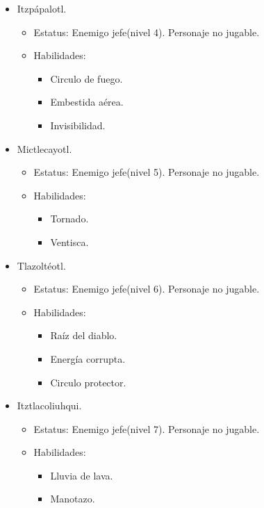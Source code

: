\begin{itemize}
\begin{itemize}
			\end{itemize}
		\item Itzpápalotl.
			\begin{itemize}
				\item Estatus: Enemigo jefe(nivel 4). Personaje no jugable.
				\item Habilidades: 
					\begin{itemize}
						\item Circulo de fuego.
						\item Embestida aérea.
						\item Invisibilidad.
					\end{itemize}
			\end{itemize}
		\item Mictlecayotl.
			\begin{itemize}
				\item Estatus: Enemigo jefe(nivel 5). Personaje no jugable.
				\item Habilidades: 
					\begin{itemize}
						\item Tornado.
						\item Ventisca.
					\end{itemize}
			\end{itemize}
		\item Tlazoltéotl.
			\begin{itemize}
				\item Estatus: Enemigo jefe(nivel 6). Personaje no jugable.
				\item Habilidades: 
					\begin{itemize}
						\item Raíz del diablo.
						\item Energía corrupta.
						\item Circulo protector.
					\end{itemize}
			\end{itemize}
		\item Itztlacoliuhqui.
			\begin{itemize}
				\item Estatus: Enemigo jefe(nivel 7). Personaje no jugable.
				\item Habilidades: 
					\begin{itemize}
						\item Lluvia de lava.
						\item Manotazo.

\end{itemize}
\end{itemize}
\end{itemize}

